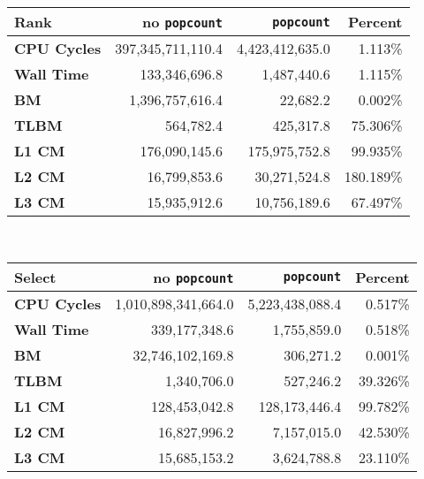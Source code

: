 \begin{tabular}{|l|r|r|r|}
\hline
\textbf{Rank} & no \texttt{popcount} & \texttt{popcount} & Percent \\ \hline
\textbf{CPU Cycles} & 397,345,711,110.4 & 4,423,412,635.0 & 1.113\% \\ \hline
\textbf{Wall Time} & 133,346,696.8 & 1,487,440.6 & 1.115\% \\ \hline
\textbf{BM} & 1,396,757,616.4 & 22,682.2 & 0.002\% \\ \hline
\textbf{TLBM} & 564,782.4 & 425,317.8 & 75.306\% \\ \hline
\textbf{L1 CM} & 176,090,145.6 & 175,975,752.8 & 99.935\% \\ \hline
\textbf{L2 CM} & 16,799,853.6 & 30,271,524.8 & 180.189\% \\ \hline
\textbf{L3 CM} & 15,935,912.6 & 10,756,189.6 & 67.497\% \\ \hline
\end{tabular}\\[5pt]
\begin{tabular}{|l|r|r|r|}
\hline
\textbf{Select} & no \texttt{popcount} & \texttt{popcount} & Percent \\ \hline
\textbf{CPU Cycles} & 1,010,898,341,664.0 & 5,223,438,088.4 & 0.517\% \\ \hline
\textbf{Wall Time} & 339,177,348.6 & 1,755,859.0 & 0.518\% \\ \hline
\textbf{BM} & 32,746,102,169.8 & 306,271.2 & 0.001\% \\ \hline
\textbf{TLBM} & 1,340,706.0 & 527,246.2 & 39.326\% \\ \hline
\textbf{L1 CM} & 128,453,042.8 & 128,173,446.4 & 99.782\% \\ \hline
\textbf{L2 CM} & 16,827,996.2 & 7,157,015.0 & 42.530\% \\ \hline
\textbf{L3 CM} & 15,685,153.2 & 3,624,788.8 & 23.110\% \\ \hline
\end{tabular}\\[5pt]
